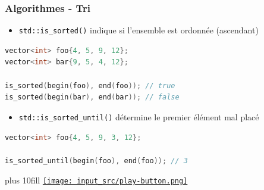 \documentclass[C++.tex]{subfiles}
\begin{document}
\begin{frame}[fragile]
	\frametitle{Algorithmes - Tri}
	\begin{itemize}
		\item \lstinline|std::is_sorted()| indique si l'ensemble est ordonnée (ascendant)
	\end{itemize}


	\begin{lstlisting}[language=C++]
vector<int> foo{4, 5, 9, 12};
vector<int> bar{9, 5, 4, 12};

is_sorted(begin(foo), end(foo)); // true
is_sorted(begin(bar), end(bar)); // false\end{lstlisting}

	\begin{itemize}
		\item \lstinline|std::is_sorted_until()| détermine le premier élément mal placé
	\end{itemize}

	\begin{lstlisting}[language=C++]
vector<int> foo{4, 5, 9, 3, 12};

is_sorted_until(begin(foo), end(foo)); // 3\end{lstlisting}

	\vskip 10mm plus 10fill
	\hfill
	\href{https://godbolt.org/#g:!((g:!((g:!((h:codeEditor,i:(filename:'1',fontScale:14,fontUsePx:'0',j:1,lang:c%2B%2B,selection:(endColumn:1,endLineNumber:28,positionColumn:1,positionLineNumber:28,selectionStartColumn:1,selectionStartLineNumber:28,startColumn:1,startLineNumber:28),source:'%23include+%3Ciostream%3E%0A%23include+%3Cvector%3E%0A%23include+%3Calgorithm%3E%0A%0Ausing+std::begin%3B%0Ausing+std::end%3B%0A%0Aint+main()%0A%7B%0A++%7B%0A++++std::vector%3Cint%3E+foo%7B4,+5,+9,+12%7D%3B%0A%0A++++std::cout+%3C%3C+std::boolalpha+%3C%3C+std::is_sorted(begin(foo),+end(foo))+%3C%3C+!'%5Cn!'%3B%0A++%7D%0A%0A++%7B%0A++++std::vector%3Cint%3E+foo%7B9,+5,+4,+12%7D%3B%0A%0A++++std::cout+%3C%3C+std::boolalpha+%3C%3C+std::is_sorted(begin(foo),+end(foo))+%3C%3C+!'%5Cn!'%3B%0A++%7D%0A%0A++%7B%0A++++std::vector%3Cint%3E+foo%7B4,+5,+2,+12%7D%3B%0A%0A++++std::cout+%3C%3C+*std::is_sorted_until(begin(foo),+end(foo))+%3C%3C+!'%5Cn!'%3B%0A++%7D%0A%7D%0A'),l:'5',n:'0',o:'C%2B%2B+source+%231',t:'0')),k:50,l:'4',n:'0',o:'',s:0,t:'0'),(g:!((h:executor,i:(argsPanelShown:'1',compilationPanelShown:'0',compiler:g112,compilerOutShown:'0',execArgs:'',execStdin:'',fontScale:14,fontUsePx:'0',j:1,lang:c%2B%2B,libs:!((name:boost,ver:'175')),options:'-std%3Dc%2B%2B11',source:1,stdinPanelShown:'1',tree:'1',wrap:'0'),l:'5',n:'0',o:'Executor+x86-64+gcc+11.2+(C%2B%2B,+Editor+%231)',t:'0')),header:(),k:50,l:'4',n:'0',o:'',s:0,t:'0')),l:'2',n:'0',o:'',t:'0')),version:4}{\texttt{[image: input\_src/play-button.png]}}
\end{frame}
\end{document}
